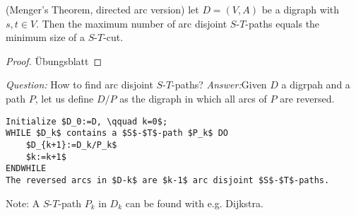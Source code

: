 \begin{cor}(Menger's Theorem, directed arc version)
let $D=(V,A)$ be a digraph with $s,t  \in V$. Then the maximum number of arc
disjoint $S$-$T$-paths equals the minimum size of a $S$-$T$-cut.
\end{cor}
\begin{proof}
Übungsblatt
\end{proof}

\emph{Question:} How to find arc disjoint $S$-$T$-paths?
\emph{Answer:}Given $D$ a digrpah and a path $P$, let us define $D/P$ as the
digraph in which all arcs of $P$ are reversed.

\begin{lstlisting}
Initialize $D_0:=D, \qquad k=0$;
WHILE $D_k$ contains a $S$-$T$-path $P_k$ DO
	$D_{k+1}:=D_k/P_k$
	$k:=k+1$
ENDWHILE
The reversed arcs in $D-k$ are $k-1$ arc disjoint $S$-$T$-paths.
\end{lstlisting}
Note: A $S$-$T$-path $P_k$ in $D_k$ can be found with e.g. Dijkstra. 
